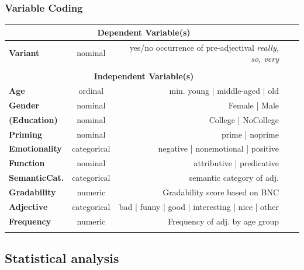 \documentclass[12pt, table]{beamer}
\begin{document}
\begin{frame}
\frametitle{Variable Coding} 
\scriptsize{
\begin{tabularx}{\textwidth}{lcrrr}
\multicolumn{3}{c}{\textbf{Dependent Variable(s)}} \\\hline 
\textbf{Variant} & nominal & yes/no occurrence of pre-adjectival \textit{really, so, very} \\
\hline\\
\multicolumn{3}{c}{\textbf{Independent Variable(s)}} \\\hline
\textbf{Age} & ordinal & min. young | middle-aged | old & \parbox[t]{2mm}{} & \parbox[t]{2mm}{}\\
\textbf{Gender} & nominal & Female | Male & &\\
\textbf{(Education)} & nominal & College | NoCollege & &\\
\hline
\textbf{Priming} & nominal & prime | noprime & &\\
\hline
\textbf{Emotionality} & categorical & negative | nonemotional | positive & \parbox[t]{2mm}{} & \parbox[t]{2mm}{}\\
\textbf{Function} & nominal & attributive | predicative & & \\
\textbf{SemanticCat.} & categorical & semantic category of adj. & & \\
\textbf{Gradability} & numeric & Gradability score based on BNC & & \\
\textbf{Adjective} & categorical & bad | funny | good | interesting | nice | other & & \\
\textbf{Frequency} & numeric & Frequency of adj. by age group & & \\
\hline
\end{tabularx}
}
\end{frame}

\subsection{Statistical analysis}
\begin{frame}
\begin{center}
\begin{large}
\end{large}
\end{center}
\end{frame}
\end{document}
